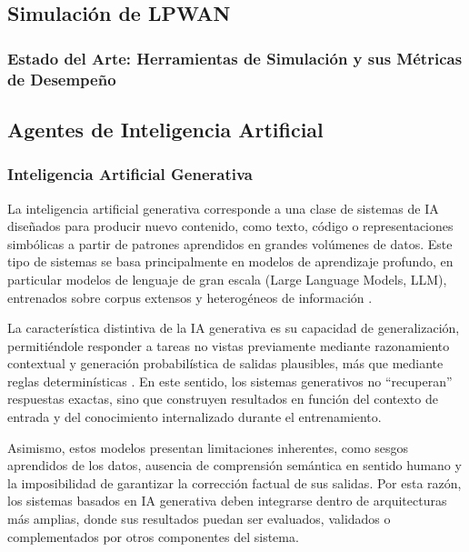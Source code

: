 \subsection{Simulación de LPWAN}

\subsubsection{Estado del Arte: Herramientas de Simulación y sus Métricas de
      Desempeño}


\subsection{Agentes de Inteligencia
      Artificial}

\subsubsection{Inteligencia Artificial Generativa}

La inteligencia artificial generativa corresponde a una clase de sistemas de  IA
diseñados para producir nuevo contenido, como texto, código  o  representaciones
simbólicas a partir de patrones aprendidos en grandes volúmenes de  datos.  Este
tipo de sistemas se basa principalmente en modelos de aprendizaje  profundo,  en
particular modelos de lenguaje de gran  escala  (Large  Language  Models,  LLM),
entrenados   sobre   corpus   extensos    y    heterogéneos    de    información
\parencite[]{feuerriegel2024generative}.

La  característica  distintiva  de  la  IA  generativa  es   su   capacidad   de
generalización, permitiéndole responder a tareas no vistas previamente  mediante
razonamiento contextual y generación probabilística de salidas  plausibles,  más
que mediante reglas determinísticas \parencite[]{feuerriegel2024generative}.  En
este sentido, los sistemas generativos no “recuperan” respuestas  exactas,  sino
que construyen resultados en función del contexto de entrada y del  conocimiento
internalizado durante el entrenamiento.

Asimismo,  estos  modelos  presentan  limitaciones   inherentes,   como   sesgos
aprendidos de los datos, ausencia de comprensión semántica en sentido  humano  y
la  imposibilidad  de  garantizar  la  corrección  factual   de   sus   salidas.
\parencite[]{feuerriegel2024generative} Por esta razón, los sistemas basados  en
IA generativa deben integrarse dentro de arquitecturas más  amplias,  donde  sus
resultados  puedan  ser  evaluados,  validados  o   complementados   por   otros
componentes del sistema.

